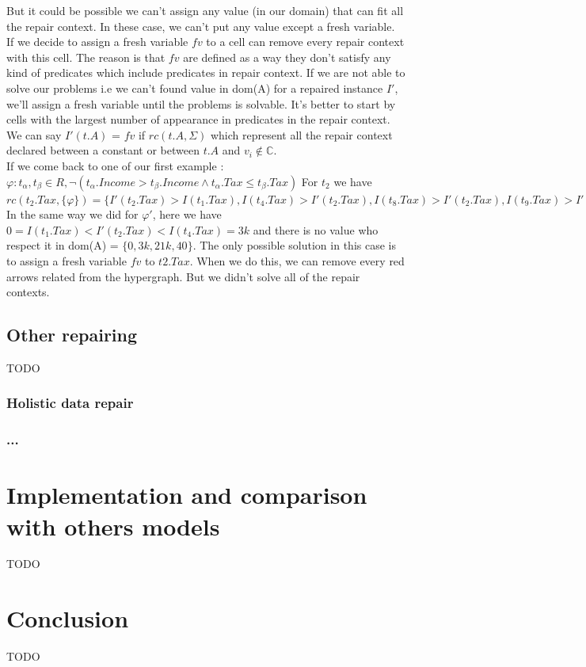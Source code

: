\documentclass[letterpaper, 12pt]{report}
\theoremstyle{definition}
\begin{document}
But it could be possible we can't assign any value (in our domain) that can fit all the repair context. In these case, we can't put any value except a fresh variable. If we decide to assign a fresh variable $fv$ to a cell can remove every repair context with this cell. The reason is that $fv$ are defined as a way they don't satisfy any kind of predicates which include predicates in repair context. If we are not able to solve our problems i.e we can't found value in dom(A) for a repaired instance $I'$, we'll assign a fresh variable until the problems is solvable. It's better to start by cells with the largest number of appearance in predicates in the repair context. We can say $I'(t.A)$ = $fv$ if $rc(t.A,\Sigma)$ which represent all the repair context declared between a constant or between $t.A$ and $v_i \not\in \mathbb{C}$.\\

If we come back to one of our first example : $\varphi : t_\alpha,t_\beta \in R, \neg(t_\alpha.Income > t_\beta.Income \wedge t_\alpha.Tax \leq t_\beta.Tax)$  For $t_2$ we have $rc(t_2.Tax,\{ \varphi \}) = \{ I'(t_2.Tax) > I(t_1.Tax),I(t_4.Tax) > I'(t_2.Tax),I(t_8.Tax) > I'(t_2.Tax),I(t_9.Tax) > I'(t_2.Tax),I(t_{10}.Tax) > I'(t_2.Tax) \}$ In the same way we did for $\varphi'$, here we have $0 = I(t_1.Tax)< I'(t_2.Tax) < I(t_4.Tax) = 3k$ and there is no value who respect it in dom(A) = $\{ 0,3k,21k,40 \}$. The only possible solution in this case is to assign a fresh variable $fv$ to $t2.Tax$. When we do this, we can remove every red arrows related from the hypergraph. But we didn't solve all of the repair contexts.
\section{Other repairing}
TODO
\subsection{Holistic data repair}
\subsection{...}

\chapter{Implementation and comparison with others models}
TODO
\chapter{Conclusion}
TODO






\newpage
\appendix
\end{document}
